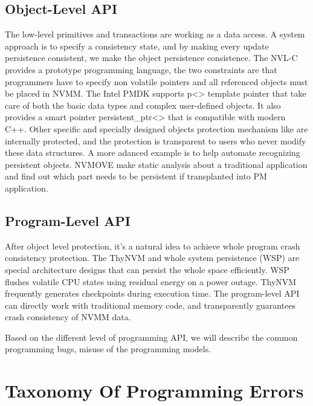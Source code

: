 \documentclass{sig-alternate}
\begin{document}
\subsection{Object-Level API}

The low-level primitives and transactions are working as a data access. A system approach is to specify a consistency state, and by making every update persistence consistent, we make the object persistence consistence. The NVL-C \cite{Denny:2016:NSA:2907294.2907303} provides  a prototype programming language, the two constraints are that programmers have to specify non volatile pointers and all referenced objects must be placed in NVMM. The Intel PMDK supports p<> template pointer that take care of both the basic data types and complex user-defined objects. It also provides a smart pointer persistent\_ptr<> that is compatible with modern C++.
	Other specific and specially designed objects protection mechanism like \cite{Venkataraman:2011:CDD:1960475.1960480} \cite{Yang2015NVTreeRC} are internally protected, and the protection is transparent to users who never modify these data structures.
	A more adanced example is to help automate recognizing persistent objects. NVMOVE \cite{Chauhan2016NVMOVEHP}make static analysis about a traditional application and find out which part needs to be persistent if transplanted into PM application.
	
\subsection{Program-Level API}
After object level protection, it's a natural idea to achieve whole program crash consistency protection.  The ThyNVM \cite{7856636} and whole system persistence (WSP) \cite{Narayanan:2012:WP:2248487.2151018} are special architecture designs that can persist the whole space efficiently. WSP flushes volatile CPU states using residual energy on a power outage. ThyNVM frequently generates checkpoints during execution time. The program-level API can directly work with traditional memory code, and transparently guarantees crash consistency of NVMM data.

Based on the different level of programming API, we will describe the common programming bugs, misuse of the programming models.



\section{Taxonomy Of Programming Errors}
\end{document}
